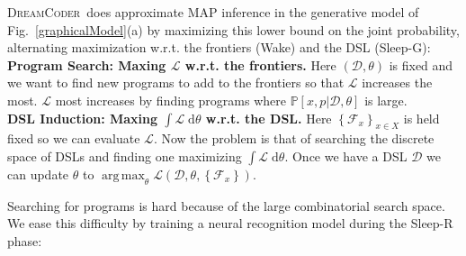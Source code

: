 \documentclass{article}
\newcommand{\system}{\textsc{DreamCoder}~}
\newcommand{\lowerBound}{\mathscr{L}}
\DeclareMathOperator*{\argmax}{arg\,max} %
\newcommand{\probability}{\mathds{P}} %
\begin{document}


\system does approximate MAP inference in the generative model of Fig.~\ref{graphicalModel}(a) by maximizing this lower bound on the joint probability,
alternating maximization w.r.t. the frontiers (Wake) and the DSL (Sleep-G):
\\\noindent \textbf{Program Search: Maxing $\lowerBound$ w.r.t. the frontiers.} Here $(\mathcal{D},\theta)$ is fixed and we
want to find new programs to add to  the frontiers so that $\lowerBound$ increases the most.
$\lowerBound$ most increases by finding programs where $\probability[x,p|\mathcal{D},\theta]$
is large.
\\\noindent \textbf{DSL Induction: Maxing $\int \lowerBound\;\mathrm{d}\theta$ w.r.t. the DSL.} Here $\left\{\mathcal{F}_x \right\}_{x\in X}$ is held fixed so we can evaluate $\lowerBound$. Now the problem is that of searching the discrete space of DSLs and finding one maximizing $\int \lowerBound\;\mathrm{d}\theta$.
Once we have a DSL $\mathcal{D}$ we can update $\theta$ to $\argmax_\theta \lowerBound(\mathcal{D},\theta,\left\{\mathcal{F}_x \right\})$. 


Searching for programs is hard because
of the large combinatorial search space. We ease this difficulty by training a neural recognition model
during the Sleep-R phase:
\end{document}
